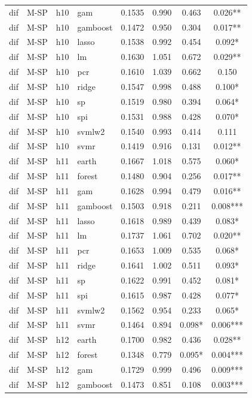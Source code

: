 \begin{ThreePartTable}
\begin{longtable}[t]{llclcccc}
dif & M-SP & h10 & gam & 0.1535 & 0.990 & 0.463 & 0.026**\\
dif & M-SP & h10 & gamboost & 0.1472 & 0.950 & 0.304 & 0.017**\\
dif & M-SP & h10 & lasso & 0.1538 & 0.992 & 0.454 & 0.092*\\
dif & M-SP & h10 & lm & 0.1630 & 1.051 & 0.672 & 0.029**\\
dif & M-SP & h10 & pcr & 0.1610 & 1.039 & 0.662 & 0.150\\
dif & M-SP & h10 & ridge & 0.1547 & 0.998 & 0.488 & 0.100*\\
dif & M-SP & h10 & sp & 0.1519 & 0.980 & 0.394 & 0.064*\\
dif & M-SP & h10 & spi & 0.1531 & 0.988 & 0.428 & 0.070*\\
dif & M-SP & h10 & svmlw2 & 0.1540 & 0.993 & 0.414 & 0.111\\
dif & M-SP & h10 & svmr & 0.1419 & 0.916 & 0.131 & 0.012**\\
\addlinespace
dif & M-SP & h11 & earth & 0.1667 & 1.018 & 0.575 & 0.060*\\
dif & M-SP & h11 & forest & 0.1480 & 0.904 & 0.256 & 0.017**\\
dif & M-SP & h11 & gam & 0.1628 & 0.994 & 0.479 & 0.016**\\
dif & M-SP & h11 & gamboost & 0.1503 & 0.918 & 0.211 & 0.008***\\
dif & M-SP & h11 & lasso & 0.1618 & 0.989 & 0.439 & 0.083*\\
dif & M-SP & h11 & lm & 0.1737 & 1.061 & 0.702 & 0.020**\\
dif & M-SP & h11 & pcr & 0.1653 & 1.009 & 0.535 & 0.068*\\
dif & M-SP & h11 & ridge & 0.1641 & 1.002 & 0.511 & 0.093*\\
dif & M-SP & h11 & sp & 0.1622 & 0.991 & 0.452 & 0.081*\\
dif & M-SP & h11 & spi & 0.1615 & 0.987 & 0.428 & 0.077*\\
dif & M-SP & h11 & svmlw2 & 0.1562 & 0.954 & 0.233 & 0.065*\\
dif & M-SP & h11 & svmr & 0.1464 & 0.894 & 0.098* & 0.006***\\
\addlinespace
dif & M-SP & h12 & earth & 0.1700 & 0.982 & 0.436 & 0.028**\\
dif & M-SP & h12 & forest & 0.1348 & 0.779 & 0.095* & 0.004***\\
dif & M-SP & h12 & gam & 0.1729 & 0.999 & 0.496 & 0.009***\\
dif & M-SP & h12 & gamboost & 0.1473 & 0.851 & 0.108 & 0.003***\\

\end{longtable}
\end{ThreePartTable}
